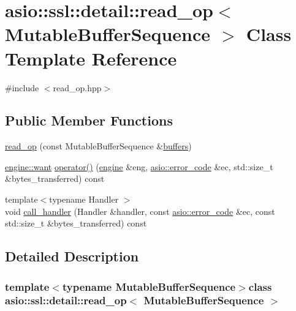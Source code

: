 \hypertarget{classasio_1_1ssl_1_1detail_1_1read__op}{}\section{asio\+:\+:ssl\+:\+:detail\+:\+:read\+\_\+op$<$ Mutable\+Buffer\+Sequence $>$ Class Template Reference}
\label{classasio_1_1ssl_1_1detail_1_1read__op}


{\ttfamily \#include $<$read\+\_\+op.\+hpp$>$}

\subsection*{Public Member Functions}
\begin{DoxyCompactItemize}
\item 
\hyperlink{classasio_1_1ssl_1_1detail_1_1read__op_a331c42f11ffe67dd1d6e236d4cabe462}{read\+\_\+op} (const Mutable\+Buffer\+Sequence \&\hyperlink{group__async__read_ga54dede45c3175148a77fe6635222c47d}{buffers})
\item 
\hyperlink{classasio_1_1ssl_1_1detail_1_1engine_ab9812153941a6a93c9095f4e5ca8f915}{engine\+::want} \hyperlink{classasio_1_1ssl_1_1detail_1_1read__op_a4572f4c46ad5a6190f9597c2daaa3817}{operator()} (\hyperlink{classasio_1_1ssl_1_1detail_1_1engine}{engine} \&eng, \hyperlink{classasio_1_1error__code}{asio\+::error\+\_\+code} \&ec, std\+::size\+\_\+t \&bytes\+\_\+transferred) const 
\item 
{\footnotesize template$<$typename Handler $>$ }\\void \hyperlink{classasio_1_1ssl_1_1detail_1_1read__op_a484687e690e1ef1620eb75567b0ed1b1}{call\+\_\+handler} (Handler \&handler, const \hyperlink{classasio_1_1error__code}{asio\+::error\+\_\+code} \&ec, const std\+::size\+\_\+t \&bytes\+\_\+transferred) const 
\end{DoxyCompactItemize}


\subsection{Detailed Description}
\subsubsection*{template$<$typename Mutable\+Buffer\+Sequence$>$class asio\+::ssl\+::detail\+::read\+\_\+op$<$ Mutable\+Buffer\+Sequence $>$}



